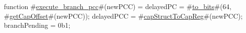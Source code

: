 function #\hyperref[zexecutezybranchzypcc]{execute\_branch\_pcc}#(newPCC) = {
  delayedPC = #\hyperref[ztozybits]{to\_bits}#(64, #\hyperref[zgetCapOffset]{getCapOffset}#(newPCC));
  delayedPCC = #\hyperref[zcapStructToCapReg]{capStructToCapReg}#(newPCC);
  branchPending = 0b1;
}
